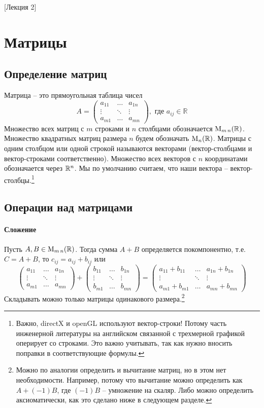 [Лекция 2]
\newpage
\section{Матрицы}

\subsection{Определение матриц}

Матрица -- это прямоугольная таблица чисел
\[
A=
\begin{pmatrix}
a_{11}&\ldots& a_{1n}\\
\vdots&\ddots&\vdots\\
a_{m1}& \ldots &a_{mn}
\end{pmatrix},\text{ где } a_{ij}\in \mathbb R
\]
Множество всех матриц с $m$ строками и $n$ столбцами обозначается $\operatorname{M}_{m\,n}(\mathbb R)$. Множество квадратных матриц размера $n$ будем обозначать $\operatorname{M}_{n}(\mathbb R)$. Матрицы с одним столбцом или одной строкой называются векторами (вектор-столбцами и вектор-строками соответственно). Множество всех векторов с $n$ координатами обозначается через $\mathbb R^{n}$. Мы по умолчанию считаем, что наши вектора -- вектор-столбцы.\footnote{Важно, directX и openGL используют вектор-строки! Потому часть инженерной литературы на английском связанной с трехмерной графикой оперирует со строками. Это важно учитывать, так как нужно вносить поправки в соответствующие формулы.}

\subsection{Операции над матрицами}

\paragraph{Сложение} Пусть $A,B\in \operatorname{M}_{m\,n}(\mathbb R)$. Тогда сумма $A+B$ определяется покомпонентно, т.е. $C = A + B$, то $c_{ij} = a_{ij} + b_{ij}$ или
\[
\begin{pmatrix}
a_{11}&\ldots& a_{1n}\\
\vdots&\ddots&\vdots\\
a_{m1}& \ldots &a_{mn}
\end{pmatrix}
+
\begin{pmatrix}
b_{11}&\ldots& b_{1n}\\
\vdots&\ddots&\vdots\\
b_{m1}& \ldots &b_{mn}
\end{pmatrix}
=
\begin{pmatrix}
a_{11}+b_{11}&\ldots& a_{1n} + b_{1n}\\
\vdots&\ddots&\vdots\\
a_{m1}+b_{m1}& \ldots &a_{mn} + b_{mn}
\end{pmatrix}
\]
Складывать можно только матрицы одинакового размера.\footnote{Можно по аналогии определить и вычитание матриц, но в этом нет необходимости. Например, потому что вычитание можно определить как $A + (-1)B$, где $(-1)B$ -- умножение на скаляр. Либо можно определить аксиоматически, как это сделано ниже в следующем разделе.}

